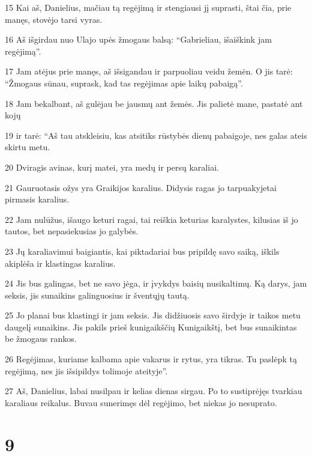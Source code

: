 \par 15 Kai aš, Danielius, mačiau tą regėjimą ir stengiausi jį suprasti, štai čia, prie manęs, stovėjo tarsi vyras. 
\par 16 Aš išgirdau nuo Ulajo upės žmogaus balsą: “Gabrieliau, išaiškink jam regėjimą”. 
\par 17 Jam atėjus prie manęs, aš išsigandau ir parpuoliau veidu žemėn. O jis tarė: “Žmogaus sūnau, suprask, kad tas regėjimas apie laikų pabaigą”. 
\par 18 Jam bekalbant, aš gulėjau be jausmų ant žemės. Jis palietė mane, pastatė ant kojų 
\par 19 ir tarė: “Aš tau atskleisiu, kas atsitiks rūstybės dienų pabaigoje, nes galas ateis skirtu metu. 
\par 20 Dviragis avinas, kurį matei, yra medų ir persų karaliai. 
\par 21 Gauruotasis ožys yra Graikijos karalius. Didysis ragas jo tarpuakyje­tai pirmasis karalius. 
\par 22 Jam nulūžus, išaugo keturi ragai, tai reiškia keturias karalystes, kilusias iš jo tautos, bet nepasiekusias jo galybės. 
\par 23 Jų karaliavimui baigiantis, kai piktadariai bus pripildę savo saiką, iškils akiplėša ir klastingas karalius. 
\par 24 Jis bus galingas, bet ne savo jėga, ir įvykdys baisių nusikaltimų. Ką darys, jam seksis, jis sunaikins galinguosius ir šventųjų tautą. 
\par 25 Jo planai bus klastingi ir jam seksis. Jis didžiuosis savo širdyje ir taikos metu daugelį sunaikins. Jis pakils prieš kunigaikščių Kunigaikštį, bet bus sunaikintas be žmogaus rankos. 
\par 26 Regėjimas, kuriame kalbama apie vakarus ir rytus, yra tikras. Tu paslėpk tą regėjimą, nes jis išsipildys tolimoje ateityje”. 
\par 27 Aš, Danielius, labai nusilpau ir kelias dienas sirgau. Po to sustiprėjęs tvarkiau karaliaus reikalus. Buvau sunerimęs dėl regėjimo, bet niekas jo nesuprato.



\chapter{9}


